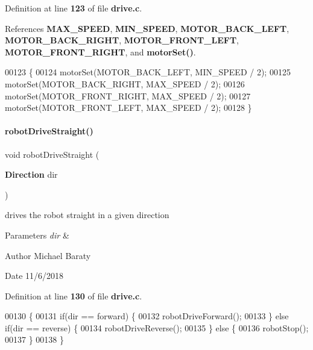 Definition at line \textbf{ 123} of file \textbf{ drive.\+c}.



References \textbf{ M\+A\+X\+\_\+\+S\+P\+E\+ED}, \textbf{ M\+I\+N\+\_\+\+S\+P\+E\+ED}, \textbf{ M\+O\+T\+O\+R\+\_\+\+B\+A\+C\+K\+\_\+\+L\+E\+FT}, \textbf{ M\+O\+T\+O\+R\+\_\+\+B\+A\+C\+K\+\_\+\+R\+I\+G\+HT}, \textbf{ M\+O\+T\+O\+R\+\_\+\+F\+R\+O\+N\+T\+\_\+\+L\+E\+FT}, \textbf{ M\+O\+T\+O\+R\+\_\+\+F\+R\+O\+N\+T\+\_\+\+R\+I\+G\+HT}, and \textbf{ motor\+Set()}.


\begin{DoxyCode}
00123                          \{
00124   motorSet(MOTOR_BACK_LEFT, MIN_SPEED / 2);
00125   motorSet(MOTOR_BACK_RIGHT, MAX_SPEED / 2);
00126   motorSet(MOTOR_FRONT_RIGHT, MAX_SPEED / 2);
00127   motorSet(MOTOR_FRONT_LEFT, MAX_SPEED / 2);
00128 \}
\end{DoxyCode}
\mbox{\label{drive_8h_a014c2a00d938c4e3c8aa626ac60e2765}} 
\paragraph{robot\+Drive\+Straight()}
{\footnotesize\ttfamily void robot\+Drive\+Straight (\begin{DoxyParamCaption}\item[{\textbf{ Direction}}]{dir }\end{DoxyParamCaption})}



drives the robot straight in a given direction 


\begin{DoxyParams}{Parameters}
{\em dir} & \\
\hline
\end{DoxyParams}
\begin{DoxyAuthor}{Author}
Michael Baraty 
\end{DoxyAuthor}
\begin{DoxyDate}{Date}
11/6/2018 
\end{DoxyDate}


Definition at line \textbf{ 130} of file \textbf{ drive.\+c}.


\begin{DoxyCode}
00130                                        \{
00131   \textcolor{keywordflow}{if}(dir == forward) \{
00132     robotDriveForward();
00133   \} \textcolor{keywordflow}{else} \textcolor{keywordflow}{if}(dir == reverse) \{
00134     robotDriveReverse();
00135   \} \textcolor{keywordflow}{else} \{
00136     robotStop();
00137   \}
00138 \}
\end{DoxyCode}
\mbox{\label{drive_8h_ab8d8bae0e22ee3c8d2f3150295e5faba}} 
